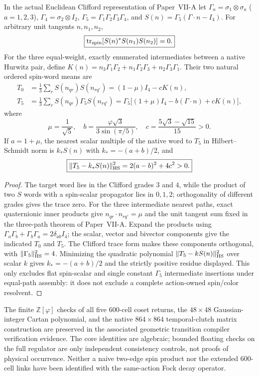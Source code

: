\documentclass[12pt,a4paper]{article}
\begin{document}
\begin{proposition}
\label{p13:prop:v3027-two-edge-clifford-obstruction}
In the actual Euclidean Clifford representation of Paper~VII-A let
$\Gamma_a=\sigma_1\otimes\sigma_a$ ($a=1,2,3$),
$\Gamma_4=\sigma_2\otimes I_2$,
$\Gamma_5=\Gamma_1\Gamma_2\Gamma_3\Gamma_4$, and
$S(n)=\Gamma_5(\Gamma\!\cdot n-I_4)$.
For arbitrary unit tangents $n,n_1,n_2$,
\[
\boxed{\operatorname{tr}_{\rm spin}
 [S(n)^*S(n_1)S(n_2)]=0.}
\]
For the three equal-weight, exactly enumerated intermediates
between a native Hurwitz pair, define
$K(n)=n_3\Gamma_1\Gamma_2+n_1\Gamma_2\Gamma_3+n_2\Gamma_3\Gamma_1$.
Their two natural ordered spin-word means are
\[
\begin{aligned}
T_0&=\tfrac13\sum_r S(n_{qr})S(n_{rq'})
=(1-\mu)I_4-cK(n),\\
T_5&=\tfrac13\sum_r S(n_{qr})\Gamma_5S(n_{rq'})
=\Gamma_5\big[(1+\mu)I_4-b(\Gamma\cdot n)+cK(n)\big],
\end{aligned}
\]
where
\[
 \mu=\frac1{\sqrt5},\quad
 b=\frac{\varphi\sqrt3}{3\sin(\pi/5)},\quad
 c=\frac{5\sqrt3-\sqrt{15}}{15}>0.
\]
If $a=1+\mu$, the nearest scalar multiple of the native word to
$T_5$ in Hilbert--Schmidt norm is
$k_*S(n)$ with $k_*=-(a+b)/2$, and
\[
\boxed{\|T_5-k_*S(n)\|_{\rm HS}^2
=2(a-b)^2+4c^2>0.}
\]
\end{proposition}
\begin{proof}
The target word lies in the Clifford grades $3$ and $4$, while the
product of two $S$ words with a spin-scalar propagator lies in
$0,1,2$; orthogonality of different grades gives the trace zero.
For the three intermediate nearest paths, exact quaternionic
inner products give $n_{qr}\cdot n_{rq'}=\mu$ and the unit tangent
sum fixed in the three-path theorem of Paper~VII-A.
Expand the products using
$\Gamma_a\Gamma_b+\Gamma_b\Gamma_a=2\delta_{ab}I_4$;
the scalar, vector and bivector components give the indicated
$T_0$ and $T_5$. The Clifford trace form makes these components
orthogonal, with $\|\Gamma_5\|_{\rm HS}^2=4$.
Minimizing the quadratic polynomial
$\|T_5-kS(n)\|_{\rm HS}^2$ over scalar $k$ gives
$k_*=-(a+b)/2$ and the strictly positive residue displayed.
This only excludes flat spin-scalar and single constant
$\Gamma_5$ intermediate insertions under equal-path assembly:
it does not exclude a complete action-owned spin/color resolvent.
\end{proof}

\begin{remark}
\label{p13:rem:v3027-three-path-audit-scope}
The finite $\mathbb Z[\varphi]$ checks of all five $600$-cell
coset returns, the $48\times48$ Gaussian-integer Cartan polynomial,
and the native $864\times864$ temporal-clutch matrix construction
are preserved in the associated geometric transition compiler
verification evidence. The core identities are algebraic; bounded
floating checks on the full regulator are only independent
consistency controls, not proofs of physical occurrence. Neither a
naive two-edge spin product nor the extended $600$-cell links have
been identified with the same-action Fock decay operator.
\end{remark}
\end{document}
